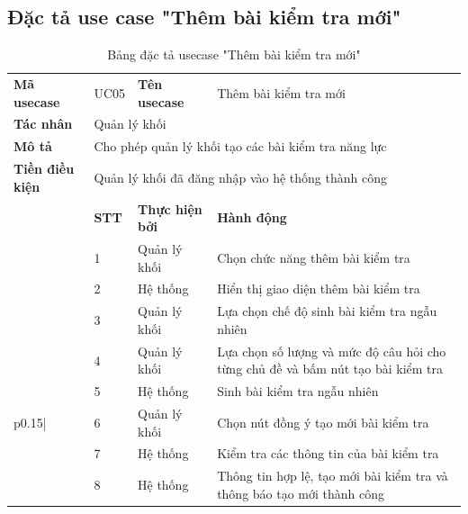 \documentclass[../DoAn.tex]{subfiles}
\begin{document}
\subsection{Đặc tả use case "Thêm bài kiểm tra mới"}
\begin{longtable}{|p{}|p{}p{}p{}|}
\caption{Bảng đặc tả usecase "Thêm bài kiểm tra mới"}
\hline
\textbf{Mã usecase} & \multicolumn{1}{p{0.1\textwidth}|}{UC05} & \multicolumn{1}{p{0.23\textwidth}|}{\textbf{Tên usecase}} & Thêm bài kiểm tra mới \\ \cline{1-4}
\textbf{Tác nhân} & \multicolumn{3}{p{0.73\textwidth}|}{Quản lý khối} \\ \cline{1-4}
\textbf{Mô tả} & \multicolumn{3}{p{0.73\textwidth}|}{Cho phép quản lý khối tạo các bài kiểm tra năng lực } \\ \cline{1-4}
\textbf{Tiền điều kiện} & \multicolumn{3}{p{0.73\textwidth}|}{Quản lý khối đã đăng nhập vào hệ thống thành công} \\ \cline{1-4}
& \multicolumn{1}{l|}{\textbf{STT}} & \multicolumn{1}{l|}{\textbf{Thực hiện bởi}} & \textbf{Hành động} \\ \cline{2-4}
& \multicolumn{1}{l|}{1} & \multicolumn{1}{p{0.23\textwidth}|}{Quản lý khối} & Chọn chức năng thêm bài kiểm tra \\ \cline{2-4} 
& \multicolumn{1}{l|}{2} & \multicolumn{1}{l|}{Hệ thống} & Hiển thị giao diện thêm bài kiểm tra \\ \cline{2-4} 
& \multicolumn{1}{l|}{3} & \multicolumn{1}{p{0.23\textwidth}|}{Quản lý khối} & Lựa chọn chế độ sinh bài kiểm tra ngẫu nhiên \\ \cline{2-4} 
& \multicolumn{1}{l|}{4} & \multicolumn{1}{p{0.23\textwidth}|}{Quản lý khối} & Lựa chọn số lượng và mức độ câu hỏi cho từng chủ đề và bấm nút tạo bài kiểm tra \\ \cline{2-4} 
& \multicolumn{1}{l|}{5} & \multicolumn{1}{p{0.23\textwidth}|}{Hệ thống} & Sinh bài kiểm tra ngẫu nhiên \\ \cline{2-4}
\multirow{-6}{\multicolumn{1}{p{0.15\textwidth}|}{\textbf{Luồng sự kiện chính}}}
& \multicolumn{1}{l|}{6} & \multicolumn{1}{p{0.23\textwidth}|}{Quản lý khối} & Chọn nút đồng ý tạo mới bài kiểm tra \\ \cline{2-4} 
& \multicolumn{1}{l|}{7} & \multicolumn{1}{p{0.23\textwidth}|}{Hệ thống} & Kiểm tra các thông tin của bài kiểm tra \\ \cline{2-4}
\hline
& \multicolumn{1}{l|}{8} & \multicolumn{1}{p{0.23\textwidth}|}{Hệ thống} & Thông tin hợp lệ, tạo mới bài kiểm tra và thông báo tạo mới thành công \\ \cline{2-4}\hline      

\end{longtable}
\end{document}
